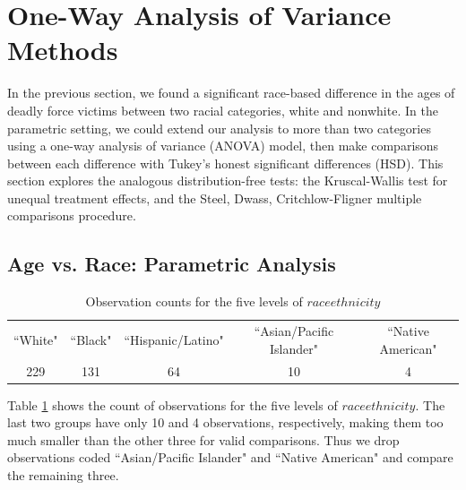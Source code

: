
\section{One-Way Analysis of Variance Methods}

\par In the previous section, we found a significant race-based difference in the ages of deadly force victims between two racial categories, white and nonwhite. In the parametric setting, we could extend our analysis to more than two categories using a one-way analysis of variance (ANOVA) model, then make comparisons between each difference with Tukey's honest significant differences (HSD). This section explores the analogous distribution-free tests: the Kruscal-Wallis test for unequal treatment effects, and the Steel, Dwass, Critchlow-Fligner multiple comparisons procedure.

\subsection{Age vs. Race: Parametric Analysis}

\begin{table}[h]
    \centering
    \begin{tabular}{|c|c|c|c|c|}
        \hline
        ``White" & ``Black" & ``Hispanic/Latino" & ``Asian/Pacific Islander" & ``Native American"\\
        229 & 131 & 64 & 10 & 4\\
        \hline
    \end{tabular}
    \caption{Observation counts for the five levels of $raceethnicity$}
    \label{tab:raceethnicity_levels_n}
\end{table}

\par Table \ref{tab:raceethnicity_levels_n} shows the count of observations for the five levels of $raceethnicity$. The last two groups have only 10 and 4 observations, respectively, making them too much smaller than the other three for valid comparisons. Thus we drop observations coded ``Asian/Pacific Islander" and ``Native American" and compare the remaining three.

